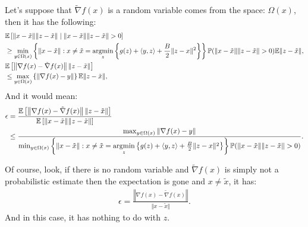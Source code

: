 \documentclass[12pt]{article}
\newcommand{\expect}{\ensuremath{\mathbb E}}
\newcommand{\prob}{\ensuremath{\mathbb P}}
\begin{document}
        Let's suppose that $\tilde \nabla f(x)$ is a random variable comes from the space: $\Omega(x)$, then it has the following: 
        {\small
        \begin{align*}
            & \expect \left[
                \Vert x - \tilde x\Vert\Vert z - \tilde x\Vert \; | \; 
                \Vert x - \tilde x\Vert\Vert z - \tilde x\Vert > 0
            \right] 
            \\
            &\ge
            \min_{y \in \Omega(x)}\left\lbrace
                \Vert x - \tilde x\Vert
                :x\neq \tilde x = \argmin_{z}\left\lbrace
                    g(z) + \langle y, z\rangle + \frac{B}{2}\Vert z - x\Vert^2
                \right\rbrace
            \right\rbrace
            \prob(
                \Vert x - \tilde x\Vert\Vert z - \tilde x\Vert > 0
            )
            \expect\Vert z - \tilde x\Vert, 
            \\
            & \expect \left[
                \left\Vert \nabla f(x) - \tilde \nabla f(x) \right\Vert \Vert z - \tilde x\Vert
            \right]
            \\
            &\le 
            \max_{y \in \Omega(x)}\left\lbrace
                \Vert \nabla f(x) - y\Vert 
            \right\rbrace\expect\Vert z - \tilde x \Vert, 
        \end{align*}
        }
        And it would mean: 
        {\small
        \begin{align*}
            \epsilon &= 
            \frac{
                \expect \left[
                    \left\Vert  \nabla f(x) - \tilde \nabla f(x) \right\Vert \Vert z - \tilde x\Vert
                \right]
            }{
            \expect \left[
                \Vert x - \tilde x\Vert\Vert z - \tilde x\Vert
            \right]
            }\\
            &\le \frac{
                \max_{y \in \Omega(x)}\Vert \nabla f(x) - y\Vert 
            }{
                \min_{y \in \Omega(x)}\left\lbrace
                    \Vert x - \tilde x\Vert:
                    x\neq \tilde x = \argmin_{z}\left\lbrace
                    g(z) + \langle y, z\rangle + \frac{B}{2}\Vert z - x\Vert^2
                \right\rbrace
                \right\rbrace
                \prob(
                    \Vert x - \tilde x\Vert\Vert z - \tilde x\Vert > 0
                )
            }. 
        \end{align*}
        }
        \par
        Of course, look, if there is no random variable and $\tilde \nabla f(x)$ is simply not a probabilistic estimate then the expectation is gone and $x\neq \tilde x$, it has: 
        \begin{align*}
            \epsilon = \frac{\left\Vert
                \nabla f(x) - \tilde \nabla f(x)
            \right\Vert}{\Vert x - \tilde x\Vert}.
        \end{align*}
        And in this case, it has nothing to do with $z$. 
\end{document}
